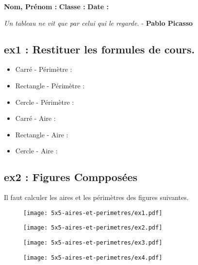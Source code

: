 



\textbf{Nom, Prénom :} \hspace{8cm} \textbf{Classe :} \hspace{3cm} \textbf{Date :}\\

\begin{center}
  \textit{Un tableau ne vit que par celui qui le regarde.}  - \textbf{Pablo Picasso}
\end{center}

\subsection*{ex1 : Restituer les formules de cours.}

\begin{multicols}{2}
\begin{itemize}
  \item Carré - Périmètre :\dotfill 
  \item Rectangle - Périmètre : \dotfill 
  \item Cercle - Périmètre : \dotfill
  \item Carré - Aire : \dotfill 
  \item Rectangle - Aire : \dotfill 
  \item Cercle - Aire : \dotfill
\end{itemize}
\end{multicols}

\subsection*{ex2 : Figures Compposées}
Il faut calculer les aires et les périmètres des figures suivantes. 

\begin{multicols}{2}
  \begin{figure}[H]
    \centering
    \texttt{[image: 5x5-aires-et-perimetres/ex1.pdf]}
  \end{figure}

  \begin{figure}[H]
    \centering
    \texttt{[image: 5x5-aires-et-perimetres/ex2.pdf]}
  \end{figure}
\end{multicols}

\Pointilles[26]

\newpage


\begin{multicols}{2}
   \begin{figure}[H]
    \centering
    \texttt{[image: 5x5-aires-et-perimetres/ex3.pdf]}
  \end{figure}
  
  \begin{figure}[H]
    \centering
    \texttt{[image: 5x5-aires-et-perimetres/ex4.pdf]}
  \end{figure}
  
\end{multicols}

\Pointilles[37]




